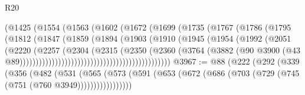 \begin{lexlean}{R20}
\begin{coremodule}
                                      (@1425
                                        (@1554
                                          (@1563
                                            (@1602
                                              (@1672
                                                (@1699
                                                  (@1735
                                                    (@1767
                                                      (@1786
                                                        (@1795
                                                          (@1812
                                                            (@1847
                                                              (@1859
                                                                (@1894
                                                                  (@1903
                                                                    (@1910
                                                                      (@1945
                                                                        (@1954
                                                                          (@1992
                                                                            (@2051
                                                                              (@2220
                                                                                (@2257
                                                                                  (@2304
                                                                                    (@2315
                                                                                      (@2350
                                                                                        (@2360
                                                                                          (@3764
                                                                                            (@3882
                                                                                              (@90
                                                                                                @3900
                                                                                                (@43
                                                                                                  @89)))))))))))))))))))))))))))))))))))))))))))))))
@3967 := @88
    (@222
      (@292
        (@339
          (@356
            (@482
              (@531
                (@565
                  (@573 (@591 (@653 (@672 (@686 (@703 (@729 (@745 (@751 (@760 @3949)))))))))))))))))

\end{coremodule}
\end{lexlean}
